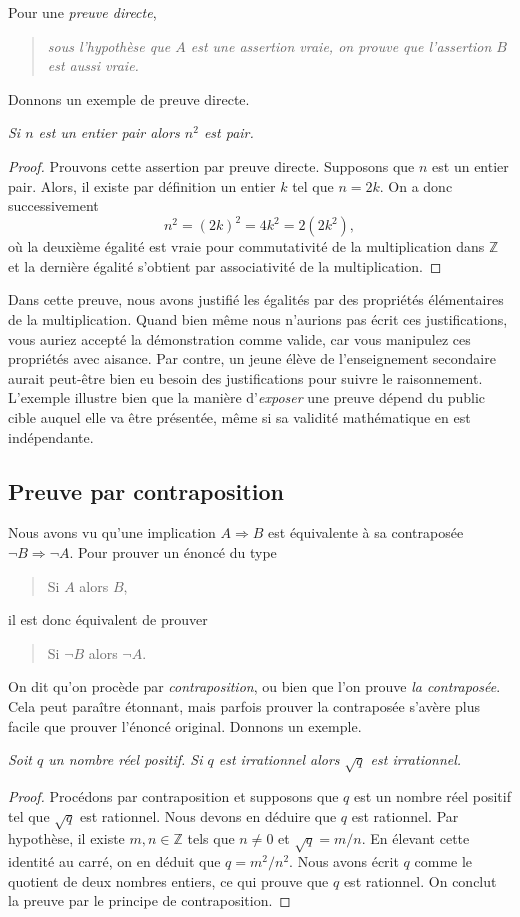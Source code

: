 \documentclass[french,course,oneside,theoremnosection]{lecture}
\newcommand{\Z}{\mathbb{Z}}
\newcommand{\iimplies}{\Rightarrow}
\begin{document}
Pour une \emph{preuve directe},
\begin{quotation}
\emph{sous l'hypothèse que $A$ est une assertion vraie, on prouve que l'assertion $B$ est aussi vraie.}
\end{quotation}
Donnons un exemple de preuve directe.
\begin{example}\label{ex:dir}
\emph{Si $n$ est un entier pair alors $n^2$ est pair.} 
\end{example}
\begin{proof}
Prouvons cette assertion par preuve directe. Supposons que $n$ est un entier pair. Alors, il existe par définition un entier $k$ tel que $n=2k$. On a donc successivement
\[
n^2=(2k)^2=4k^2=2(2k^2),
\]
où la deuxième égalité est vraie pour commutativité de la multiplication dans $\Z$ et la dernière égalité s'obtient par associativité de la multiplication.
\end{proof}
\begin{remark}
Dans cette preuve, nous avons justifié les égalités par des propriétés élémentaires de la multiplication. Quand bien même nous n'aurions pas écrit ces justifications, vous auriez accepté la démonstration comme valide, car vous manipulez ces propriétés avec aisance. Par contre, un jeune élève de l'enseignement secondaire aurait peut-être bien eu besoin des justifications pour suivre le raisonnement. L'exemple illustre bien que la manière d'\emph{exposer} une preuve dépend du public cible auquel elle va être présentée, même si sa validité mathématique en est indépendante.
\end{remark}

\subsection{Preuve par contraposition}
Nous avons vu qu'une implication $A \iimplies B$ est équivalente à sa contraposée $\neg B  \iimplies \neg A$. Pour prouver un énoncé du type 
\begin{quotation}
Si $A$ alors $B$,
\end{quotation}
il est donc équivalent de prouver 
\begin{quotation}
Si $\neg B$ alors $\neg A$.
\end{quotation}
On dit qu'on procède par \emph{contraposition}, ou bien que l'on prouve \emph{la contraposée}. Cela peut paraître étonnant, mais parfois prouver la contraposée s'avère plus facile que prouver l'énoncé original. Donnons un exemple.
\begin{example}
\emph{Soit $q$ un nombre réel positif. Si $q$ est irrationnel alors $\sqrt{q}$ est irrationnel.}
\end{example} 
\begin{proof}
Procédons par contraposition et supposons que $q$ est un nombre réel positif tel que $\sqrt{q}$ est rationnel. Nous devons en déduire que $q$ est rationnel. Par hypothèse, il existe $m,n \in \Z$ tels que $n\neq 0$ et $\sqrt{q}={m}/{n}$. En élevant cette identité au carré, on en déduit que $q={m^2}/{n^2}$. Nous avons écrit $q$ comme le quotient de deux nombres entiers, ce qui prouve que $q$ est rationnel. On conclut la preuve par le principe de contraposition.
\end{proof}
\end{document}

